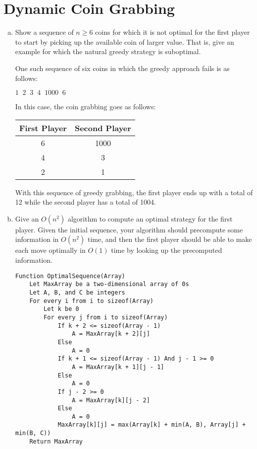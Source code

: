 \documentclass[12pt]{article}
\begin{document}
\maketitle

\section{Dynamic Coin Grabbing}\label{coin grabbing}
\begin{enumerate}[(a)]
\item Show a sequence of $n \geq 6$ coins for which it is not optimal for the first player to start by picking up the available coin of larger value. That is, give an example for which the natural greedy strategy is suboptimal.
\begin{addmargin}[2em]{2em}
One such sequence of six coins in which the greedy approach fails is as follows:
\begin{center}
$1 \;\; 2 \;\; 3 \;\; 4 \;\; 1000 \;\; 6$
\end{center}
In this case, the coin grabbing goes as follows:
\begin{center}
\begin{tabular}{c || c}
First Player & Second Player \\
\hline
6 & 1000 \\
4 & 3 \\
2 & 1 \\
\end{tabular}
\end{center}
With this sequence of greedy grabbing, the first player ends up with a total of 12 while the second player has a total of 1004.
\end{addmargin}
\item Give an $O(n^2)$ algorithm to compute an optimal strategy for the first player. Given the initial sequence, your algorithm should precompute some information in $O(n^2)$ time, and then the first player should be able to make each move optimally in $O(1)$ time by looking up the precomputed information.
\begin{addmargin}[2em]{2em}
\begin{lstlisting}
Function OptimalSequence(Array)
	Let MaxArray be a two-dimensional array of 0s
	Let A, B, and C be integers
	For every i from i to sizeof(Array)
		Let k be 0
		For every j from i to sizeof(Array)
			If k + 2 <= sizeof(Array - 1)
				A = MaxArray[k + 2][j]
			Else
				A = 0
			If k + 1 <= sizeof(Array - 1) And j - 1 >= 0
				A = MaxArray[k + 1][j - 1]
			Else
				A = 0
			If j - 2 >= 0
				A = MaxArray[k][j - 2]
			Else
				A = 0
			MaxArray[k][j] = max(Array[k] + min(A, B), Array[j] + min(B, C))
	Return MaxArray


\end{lstlisting}
\end{addmargin}
\end{enumerate}
\end{document}
